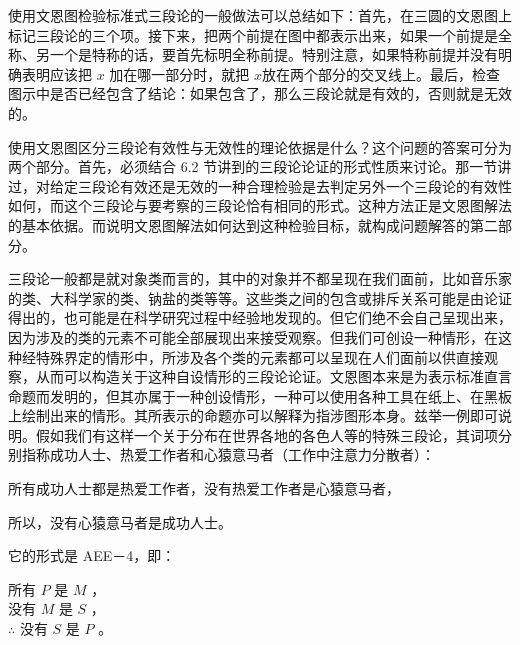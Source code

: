 使用文恩图检验标准式三段论的一般做法可以总结如下：首先，在三圆的文恩图上标记三段论的三个项。接下来，把两个前提在图中都表示出来，如果一个前提是全称、另一个是特称的话，要首先标明全称前提。特别注意，如果特称前提并没有明确表明应该把 $x$ 加在哪一部分时，就把 $x$放在两个部分的交叉线上。最后，检查图示中是否已经包含了结论：如果包含了，那么三段论就是有效的，否则就是无效的。

使用文恩图区分三段论有效性与无效性的理论依据是什么？这个问题的答案可分为两个部分。首先，必须结合 6.2 节讲到的三段论论证的形式性质来讨论。那一节讲过，对给定三段论有效还是无效的一种合理检验是去判定另外一个三段论的有效性如何，而这个三段论与要考察的三段论恰有相同的形式。这种方法正是文恩图解法的基本依据。而说明文恩图解法如何达到这种检验目标，就构成问题解答的第二部分。

三段论一般都是就对象类而言的，其中的对象并不都呈现在我们面前，比如音乐家的类、大科学家的类、钠盐的类等等。这些类之间的包含或排斥关系可能是由论证得出的，也可能是在科学研究过程中经验地发现的。但它们绝不会自己呈现出来，因为涉及的类的元素不可能全部展现出来接受观察。但我们可创设一种情形，在这种经特殊界定的情形中，所涉及各个类的元素都可以呈现在人们面前以供直接观察，从而可以构造关于这种自设情形的三段论论证。文恩图本来是为表示标准直言命题而发明的，但其亦属于一种创设情形，一种可以使用各种工具在纸上、在黑板上绘制出来的情形。其所表示的命题亦可以解释为指涉图形本身。兹举一例即可说明。假如我们有这样一个关于分布在世界各地的各色人等的特殊三段论，其词项分别指称成功人士、热爱工作者和心猿意马者（工作中注意力分散者）：

所有成功人士都是热爱工作者，没有热爱工作者是心猿意马者，

所以，没有心猿意马者是成功人士。

它的形式是 AEE－4，即：

所有 $P$ 是 $M$ ，\\
没有 $M$ 是 $S$ ，\\
$\therefore$ 没有 $S$ 是 $P$ 。 